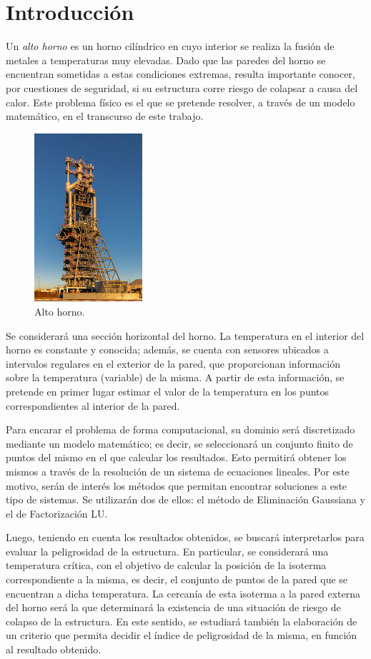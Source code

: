 \section{Introducción}

  Un \emph{alto horno} es un horno cilíndrico en cuyo interior se realiza la fusión de metales a temperaturas muy elevadas. Dado que las paredes del horno se encuentran sometidas a estas condiciones extremas, resulta importante conocer, por cuestiones de seguridad, si su estructura corre riesgo de colapsar a causa del calor. Este problema físico es el que se pretende resolver, a través de un modelo matemático, en el transcurso de este trabajo.

  \begin{figure}[h]
    \centering
    \includegraphics[width=4cm]{imagenes/altoHorno.jpg}
    \caption{Alto horno.} \label{fig:alto-horno}
  \end{figure}

  Se considerará una sección horizontal del horno. La temperatura en el interior del horno es constante y conocida; además, se cuenta con sensores ubicados a intervalos regulares en el exterior de la pared, que proporcionan información sobre la temperatura (variable) de la misma. A partir de esta información, se pretende en primer lugar estimar el valor de la temperatura en los puntos correspondientes al interior de la pared.

  Para encarar el problema de forma computacional, su dominio será discretizado mediante un modelo matemático; es decir, se seleccionará un conjunto finito de puntos del mismo en el que calcular los resultados. Esto permitirá obtener los mismos a través de la resolución de un sistema de ecuaciones lineales. Por este motivo, serán de interés los métodos que permitan encontrar soluciones a este tipo de sistemas. Se utilizarán dos de ellos: el método de Eliminación Gaussiana y el de Factorización LU.

  Luego, teniendo en cuenta los resultados obtenidos, se buscará interpretarlos para evaluar la peligrosidad de la estructura. En particular, se considerará una temperatura crítica, con el objetivo de calcular la posición de la isoterma correspondiente a la misma, es decir, el conjunto de puntos de la pared que se encuentran a dicha temperatura. La cercanía de esta isoterma a la pared externa del horno será la que determinará la existencia de una situación de riesgo de colapso de la estructura. En este sentido, se estudiará también la elaboración de un criterio que permita decidir el índice de peligrosidad de la misma, en función al resultado obtenido.
